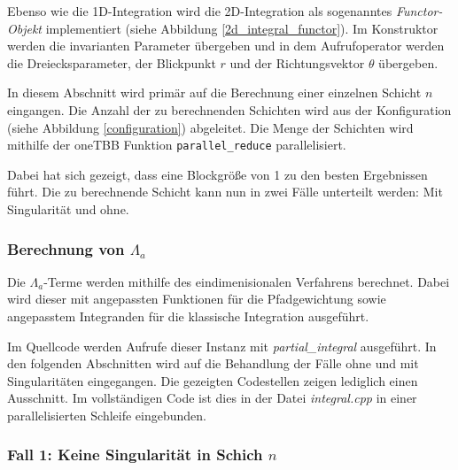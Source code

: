 Ebenso wie die 1D-Integration wird die 2D-Integration als sogenanntes \textit{Functor-Objekt} implementiert (siehe Abbildung \ref{2d_integral_functor}). 
Im Konstruktor werden die invarianten Parameter übergeben und in dem Aufrufoperator werden die Dreiecksparameter, der Blickpunkt $r$ und der Richtungsvektor $\theta$ übergeben.

In diesem Abschnitt wird primär auf die Berechnung einer einzelnen Schicht $n$ eingangen. Die Anzahl der zu berechnenden Schichten wird aus der Konfiguration (siehe Abbildung \ref{configuration}) abgeleitet. 
Die Menge der Schichten wird mithilfe der oneTBB Funktion \texttt{parallel\_reduce} parallelisiert.

\begin{center}
    
    \label{2d_integral_parallel}
\end{center}

Dabei hat sich gezeigt, dass eine Blockgröße von 1 zu den besten Ergebnissen führt.
Die zu berechnende Schicht kann nun in zwei Fälle unterteilt werden: Mit Singularität und ohne.

\subsubsection*{Berechnung von $\Lambda_a$}

Die $\Lambda_a$-Terme werden mithilfe des eindimenisionalen Verfahrens berechnet.
Dabei wird dieser mit angepassten Funktionen für die Pfadgewichtung sowie angepasstem Integranden für die klassische Integration ausgeführt.

\begin{center}
    
\end{center}

Im Quellcode werden Aufrufe dieser Instanz mit \textit{partial\_integral} ausgeführt.
In den folgenden Abschnitten wird auf die Behandlung der Fälle ohne und mit Singularitäten eingegangen.
Die gezeigten Codestellen zeigen lediglich einen Ausschnitt. Im vollständigen Code ist dies in der Datei \textit{integral.cpp} in einer parallelisierten Schleife
eingebunden. 

\subsubsection*{Fall 1: Keine Singularität in Schich $n$}

